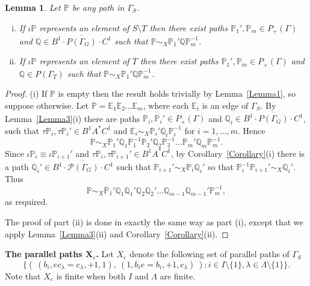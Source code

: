 \documentclass[11pt]{amsart}
\newtheorem{lem}{Lemma}
\theoremstyle{plain}
\begin{document}
\begin{lem}\label{Lemma6}
Let ${\mathbb{P}}$ be any path in $\Gamma_S$.
\begin{enumerate}[(i)]
\item If $\iota {\mathbb{P}}$ represents an element of $S \setminus T $ 
then there exist paths ${\mathbb{P}}_1', {\mathbb{P}}_m \in P_+(\Gamma)$ 
and ${\mathbb{Q}} \in \overline{B^1 \cdot P(\Gamma_G) \cdot C^1}$ such that ${\mathbb{P}} \sim_X {\mathbb{P}}_1' {\mathbb{Q}} {\mathbb{P}}_m^{-1}$.
\item If $\iota {\mathbb{P}}$ represents an element of $T$ then there exist paths ${\mathbb{P}}_1', {\mathbb{P}}_m \in P_+(\Gamma)$ and  ${\mathbb{Q}} \in P(\Gamma_T)$ such that ${\mathbb{P}} \sim_X {\mathbb{P}}_1' {\mathbb{Q}} {\mathbb{P}}_m^{-1}$.
\end{enumerate}
\end{lem}
\begin{proof}
(i) If ${\mathbb{P}}$ is empty then the result holds trivially by Lemma~\ref{Lemma1}, so suppose otherwise. 
Let ${\mathbb{P}} = {\mathbb{E}}_1 {\mathbb{E}}_2 \ldots {\mathbb{E}}_m$, where each ${\mathbb{E}}_i$ is an edge of $\Gamma_S$. By Lemma~\ref{Lemma3}(i) there are paths ${\mathbb{P}}_i, {\mathbb{P}}_i' \in P_+(\Gamma)$ and ${\mathbb{Q}}_i \in \overline{B^1 \cdot P(\Gamma_G) \cdot C^1}$, such that $\tau {\mathbb{P}}_i, \tau {\mathbb{P}}_i' \in B^1 A^* C^1$ and ${\mathbb{E}}_i \sim_X {\mathbb{P}}_i' {\mathbb{Q}}_i {\mathbb{P}}_i^{-1}$ for $i=1,\ldots,m$. Hence
\[
{\mathbb{P}} \sim_X
{\mathbb{P}}_1' {\mathbb{Q}}_1 {\mathbb{P}}_1^{-1}
{\mathbb{P}}_2' {\mathbb{Q}}_2 {\mathbb{P}}_2^{-1}
\ldots
{\mathbb{P}}_m' {\mathbb{Q}}_m {\mathbb{P}}_m^{-1}.
\]
Since $\iota {\mathbb{P}}_i \equiv \iota {\mathbb{P}}_{i+1}'$ and $\tau {\mathbb{P}}_i, \tau {\mathbb{P}}_{i+1}' \in B^1 A^* C^1$, by Corollary~\ref{Corollary}(i) there is a path ${\mathbb{Q}}_i' \in \overline{B^1 \cdot \mathcal{P}(\Gamma_G) \cdot C^1}$ such that ${\mathbb{P}}_{i+1}' \sim_X {\mathbb{P}}_i {\mathbb{Q}}_i'$ so that ${\mathbb{P}}_i^{-1} {\mathbb{P}}_{i+1}' \sim_X {\mathbb{Q}}_i'$. Thus
\[
{\mathbb{P}} \sim_X
{\mathbb{P}}_1'
{\mathbb{Q}}_1 {\mathbb{Q}}_1'
{\mathbb{Q}}_2 {\mathbb{Q}}_2'
\ldots
{\mathbb{Q}}_{m-1} {\mathbb{Q}}_{m-1}'
{\mathbb{P}}_m^{-1},
\]
as required.

The proof of part (ii) is done in exactly the same way as part (i), except that we apply 
Lemma~\ref{Lemma3}(ii)
and
Corollary~\ref{Corollary}(ii). \end{proof}

\noindent \textbf{The parallel paths $\mathbf X_e$.} Let $X_e$ denote the following set of parallel paths of $\Gamma_S$ 
\[
\{ (\ (b_i, e c_{\lambda} = c_{\lambda}, +1, 1), \  (1, b_i e = b_i, +1, c_{\lambda}) \ ) : i \in I \setminus \{ 1 \}, \lambda \in \Lambda \setminus \{ 1 \} \}.
\]
Note that $X_e$ is finite when both $I$ and $\Lambda$ are finite. 
\end{document}
